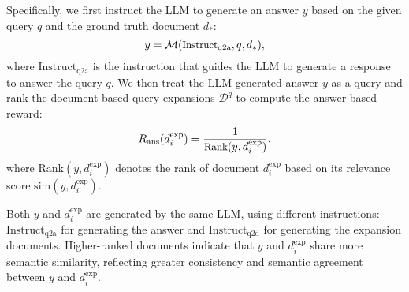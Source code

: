 Specifically, we first instruct the LLM to generate an answer $y$ based on the given query $q$ and the ground truth document $d_*$:
\begin{equation}
\small
y = \mathcal{M}(\text{Instruct}_\text{q2a}, q, d_*),
\end{equation}
where $\text{Instruct}_\text{q2a}$ is the instruction that guides the LLM to generate a response to answer the query $q$. We then treat the LLM-generated answer $y$ as a query and rank the document-based query expansions $\mathcal{D}^q$ to compute the answer-based reward:  
\begin{equation}
\small
R_{\text{ans}}(d^{\text{exp}}_i) = \frac{1}{\text{Rank}(y, d^{\text{exp}}_i)},
\end{equation}
where $\text{Rank}(y, d^{\text{exp}}_i)$ denotes the rank of document $d^{\text{exp}}_i$ based on its relevance score $\text{sim}(y, d^{\text{exp}}_i)$.

Both $y$ and $d^{\text{exp}}_i$ are generated by the same LLM, using different instructions: $\text{Instruct}_\text{q2a}$ for generating the answer and $\text{Instruct}_\text{q2d}$ for generating the expansion documents. Higher-ranked documents indicate that $y$ and $d^{\text{exp}}_i$ share more semantic similarity, reflecting greater consistency and semantic agreement between $y$ and $d^{\text{exp}}_i$.







